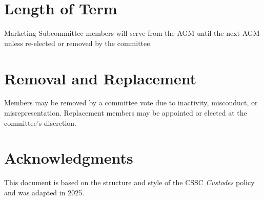 \documentclass[10pt,a4paper]{report}
\begin{document}
		\section*{Length of Term}
		Marketing Subcommittee members will serve from the AGM until the next AGM unless re-elected or removed by the committee.

		\section*{Removal and Replacement}
		Members may be removed by a committee vote due to inactivity, misconduct, or misrepresentation. Replacement members may be appointed or elected at the committee's discretion.

		\section*{Acknowledgments}
		This document is based on the structure and style of the CSSC \textit{Custodes} policy and was adapted in 2025.
\end{document}
